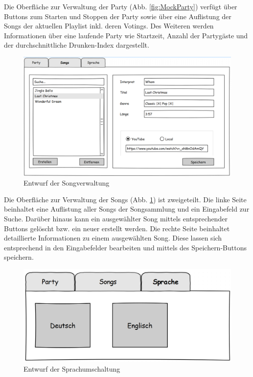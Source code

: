 Die Oberfläche zur Verwaltung der Party (Abb. \ref{fig:MockParty}) verfügt über Buttons zum Starten und Stoppen der Party sowie über eine Auflistung der Songs der aktuellen Playlist inkl. deren Votings. Des Weiteren werden Informationen über eine laufende Party wie Startzeit, Anzahl der Partygäste und der durchschnittliche Drunken-Index dargestellt.

\begin{figure}[H]
\centering
\includegraphics[width=1\linewidth]{Bilder/MockSongVerwaltung}
\caption{Entwurf der Songverwaltung}
\label{fig:MockSongVerwaltung}
\end{figure}

Die Oberfläche zur Verwaltung der Songs (Abb. \ref{fig:MockSongVerwaltung}) ist zweigeteilt. Die linke Seite beinhaltet eine Auflistung aller Songs der Songsammlung und ein Eingabefeld zur Suche. Darüber hinaus kann ein ausgewählter Song mittels entsprechender Buttons gelöscht bzw. ein neuer erstellt werden. Die rechte Seite 
beinhaltet detaillierte Informationen zu einem ausgewählten Song. Diese lassen sich entsprechend in den Eingabefelder bearbeiten und mittels des Speichern-Buttons speichern.

\begin{figure}[H]
\centering
\includegraphics[width=0.6\linewidth]{Bilder/MockSprachen}
\caption{Entwurf der Sprachumschaltung}
\label{fig:MockSprachen}
\end{figure}

